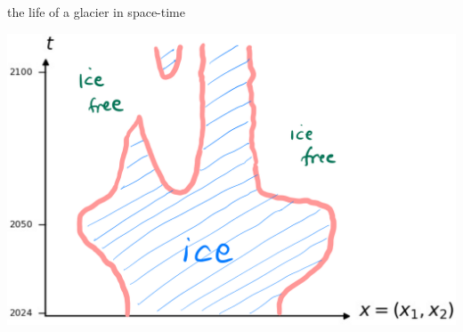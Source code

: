 \documentclass[10pt,dvipsnames]{beamer}
\begin{document}
\begin{frame}{the life of a glacier in space-time}

\bigskip
\hfill \includegraphics[width=\textwidth]{xtcartoon}
\end{frame}
\end{document}

